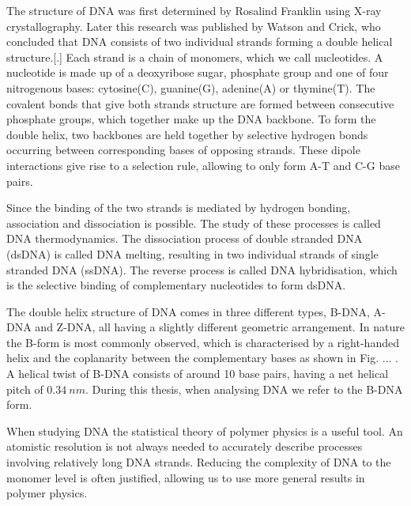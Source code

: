 The structure of DNA was first determined by Rosalind Franklin using X-ray
crystallography. Later this research was published by Watson and Crick, who concluded
that DNA consists of two individual strands forming a double helical
structure.[.] Each strand is a chain of monomers, which we call nucleotides. A nucleotide
is made up of a
deoxyribose sugar, phosphate group and one of four nitrogenous bases: cytosine(C),
guanine(G), adenine(A) or thymine(T). The covalent bonds that give both strands structure
are formed between consecutive phosphate groups, which together make up the DNA backbone.
To form the double helix, two backbones are held together by
selective hydrogen bonds occurring between corresponding bases of opposing strands. These
dipole interactions give rise to a selection rule, allowing to only form A-T and C-G base
pairs.

Since the binding of the two strands is mediated by hydrogen bonding, association and
dissociation is possible. The study of these processes is called DNA thermodynamics. The
dissociation process of double stranded DNA (dsDNA) is called DNA melting, resulting in
two individual strands of single stranded DNA (ssDNA). The reverse process is called DNA
hybridisation, which is the selective binding of complementary nucleotides to form dsDNA.

The double helix structure of DNA comes in three different types, B-DNA, A-DNA and Z-DNA,
all having a slightly different geometric arrangement. In nature the B-form is most
commonly observed, which is characterised by a right-handed helix and the coplanarity
between the complementary bases as shown in Fig. ... . A helical twist of B-DNA consists
of around 10 base pairs, having a net helical pitch of $0.34\ nm$. During this thesis,
when analysing DNA we refer to the B-DNA form.

When studying DNA the statistical theory of polymer physics is a useful tool. An
atomistic resolution is not always needed to accurately describe processes involving
relatively long DNA strands.  Reducing the complexity of DNA to the monomer level is
often justified, allowing us to use more general results in polymer physics.


